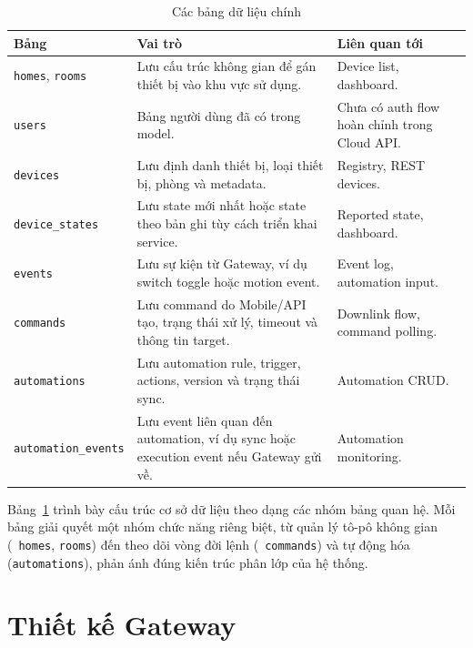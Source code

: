 \begin{table}[H]
    \centering
    \caption{Các bảng dữ liệu chính}
    \label{tab:ch3-db-tables}
    \footnotesize
    \setlength{\tabcolsep}{3pt}
    \begin{tabular}{|>{\raggedright\arraybackslash}p{3.3cm}|>{\raggedright\arraybackslash}p{7.4cm}|>{\raggedright\arraybackslash}p{2.9cm}|}
        \hline
        \textbf{Bảng} & \textbf{Vai trò} & \textbf{Liên quan tới} \\
        \hline
        \texttt{homes}, \texttt{rooms} & Lưu cấu trúc không gian để gán thiết bị vào khu vực sử dụng. & Device list, dashboard. \\
        \hline
        \texttt{users} & Bảng người dùng đã có trong model. & Chưa có auth flow hoàn chỉnh trong Cloud API. \\
        \hline
        \texttt{devices} & Lưu định danh thiết bị, loại thiết bị, phòng và metadata. & Registry, REST devices. \\
        \hline
        \texttt{device\_states} & Lưu state mới nhất hoặc state theo bản ghi tùy cách triển khai service. & Reported state, dashboard. \\
        \hline
        \texttt{events} & Lưu sự kiện từ Gateway, ví dụ switch toggle hoặc motion event. & Event log, automation input. \\
        \hline
        \texttt{commands} & Lưu command do Mobile/API tạo, trạng thái xử lý, timeout và thông tin target. & Downlink flow, command polling. \\
        \hline
        \texttt{automations} & Lưu automation rule, trigger, actions, version và trạng thái sync. & Automation CRUD. \\
        \hline
        \texttt{automation\_events} & Lưu event liên quan đến automation, ví dụ sync hoặc execution event nếu Gateway gửi về. & Automation monitoring. \\
        \hline
    \end{tabular}
    \setlength{\tabcolsep}{6pt}
\end{table}

Bảng~\ref{tab:ch3-db-tables} trình bày cấu trúc cơ sở dữ liệu theo dạng các nhóm bảng quan hệ. Mỗi bảng giải quyết một nhóm chức năng riêng biệt, từ quản lý tô-pô không gian ( \texttt{homes}, \texttt{rooms}) đến theo dõi vòng đời lệnh ( \texttt{commands}) và tự động hóa (\texttt{automations}), phản ánh đúng kiến trúc phân lớp của hệ thống.

\section{Thiết kế Gateway}
\label{sec:ch3-gateway-design}

